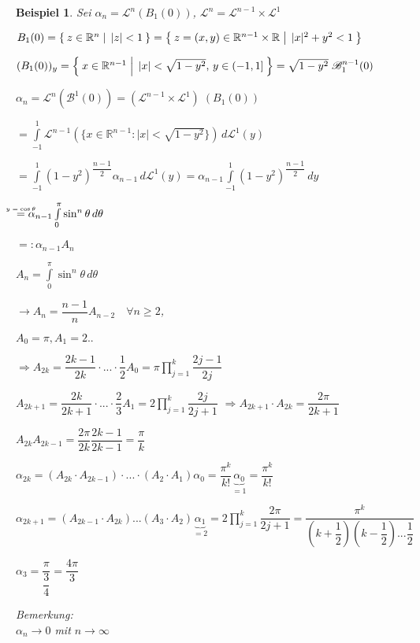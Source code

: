 \documentclass[11pt]{memoir}
\theoremstyle{changebreak}
\newtheorem{Beispiel}{Beispiel}[chapter]
\newcommand\overequal[1]{\mathrel{\overset{\makebox[0pt]{\mbox{\normalfont\tiny\sffamily $ #1 $}}}{=}}}
\begin{document}
\begin{Beispiel}
Sei $\alpha_n = \mathscr L^n(B_1(0))$,
$\mathscr L^n = \mathscr L^{n-1} \times \mathscr L^1$\\
\par
$B_1(0) = \Set{z \in \mathbb R^n| \,|z| < 1} = \Set{z = (x, y) \in \mathbb R^{n-1} \times \mathbb R| \,|x|^2 + y^2 <1} $
\par\bigskip
$(B_1(0))_y = \Set{x \in \mathbb R^{n-1}| \,|x| < \sqrt{1-y^2},\,  y \in (-1, 1]} = \sqrt{1-y^2}\;\mathscr B_1^{n-1} (0) $
\par\bigskip
$\alpha_n = \mathscr L^n(\mathscr B^1(0)) = (\mathscr L^{n-1} \times \mathscr L^1)\;(B_1(0))$
\par\bigskip
$ = \int\limits_{-1}^1 \mathscr L^{n-1}\left(\{x \in \mathbb R^{n-1}: |x| < \sqrt{1 -y^2}\}\right)\, d\mathscr L^1(y) $
\par\bigskip
$=\int\limits_{-1}^1 (1- y^2)^{\dfrac{n-1}{2}} \alpha_{n-1}\, d\mathscr L^1(y) = \alpha_{n-1} \int\limits_{-1}^1 (1 - y^2)^{\dfrac{n-1}{2}} \, dy $
\par\bigskip
$\overequal{y = \cos{\theta}}  \alpha_{n-1} \int\limits_0^\pi \sin^n \theta \, d\theta $
\par\bigskip
$=: \alpha_{n-1} A_n$  \\
\par\bigskip
$A_n = \int\limits_0^\pi \sin^n \theta\, d\theta$
\par\bigskip
$\rightarrow A_n = \dfrac{n-1}{n} A_{n-2}\quad \forall n \geq 2$,
\par\bigskip
 $A_0 = \pi, A_1 = 2..$
 \par\bigskip
$\Rightarrow A_{2k} = \dfrac{2k -1}{2k} \cdotp ... \cdotp \dfrac{1}{2} A_0 = \pi \prod\limits_{j=1}^k \dfrac{2j -1}{2j}$
\par\bigskip
$A_{2k+1} = \dfrac{2k}{2k+1} \cdotp ... \cdotp \dfrac{2}{3} A_1 = 2 \prod\limits_{j=1}^k \dfrac{2j}{2j+1}$
$\Rightarrow A_{2k+1} \cdotp A_{2k} = \dfrac{2\pi}{2k +1}$
\par\bigskip
$A_{2k} A_{2k-1} = \dfrac{2\pi}{2k} \dfrac{2k-1}{2k-1} = \dfrac{\pi}{k}$
\par\bigskip
$\alpha_{2k} = (A_{2k} \cdotp A_{2k-1})\cdotp ... \cdotp (A_2 \cdotp A_1) \alpha_0 = \dfrac{\pi^k}{k!}\underbrace{\alpha_0}_{=1} = \dfrac{\pi^k}{k!}$
\par\bigskip
$\alpha_{2k+1} = (A_{2k-1}\cdotp A_{2k}) ... (A_3 \cdotp A_2) \underbrace{\alpha_1}_{=2} = 2 \prod\limits_{j=1}^k \dfrac{2\pi}{2j+1} = \dfrac{\pi^k}{\left(k + \dfrac{1}{2}\right)\left(k- \dfrac{1}{2}\right)... \dfrac{1}{2}}$
\par\bigskip
$\alpha_3 = \dfrac{\pi}{\dfrac{3}{4}} = \dfrac{4\pi}{3}$
\par\bigskip
\emph{Bemerkung}: \\

$\alpha_n \rightarrow 0$ mit $n \rightarrow \infty$
\end{Beispiel}
\end{document}
